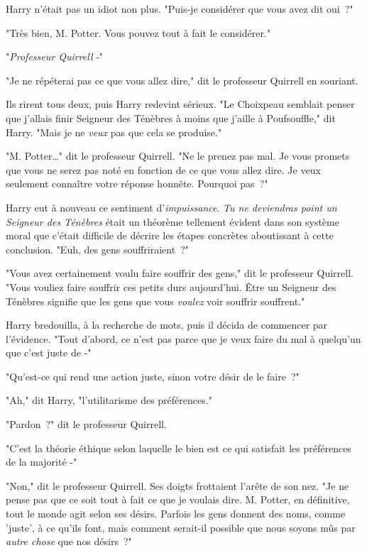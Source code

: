 Harry n'était pas un idiot non plus. "Puis-je considérer que vous avez dit oui~?"

"Très bien, M. Potter. Vous pouvez tout à fait le considérer."

"\emph{Professeur Quirrell} -"

"Je ne répéterai pas ce que vous allez dire," dit le professeur Quirrell en souriant.

Ils rirent tous deux, puis Harry redevint sérieux. "Le Choixpeau semblait penser que j'allais finir Seigneur des Ténèbres à moins que j'aille à Poufsouffle," dit Harry. "Mais je ne \emph{veux} pas que cela se produise."

"M. Potter…" dit le professeur Quirrell. "Ne le prenez pas mal. Je vous promets que vous ne serez pas noté en fonction de ce que vous allez dire. Je veux seulement connaître votre réponse honnête. Pourquoi pas~?"

Harry eut à nouveau ce sentiment d'\emph{impuissance}. \emph{Tu ne deviendras point un Seigneur des Ténèbres} était un théorème tellement évident dans son système moral que c'était difficile de décrire les étapes concrètes aboutissant à cette conclusion. "Euh, des gens souffriraient~?"

"Vous avez certainement voulu faire souffrir des gens," dit le professeur Quirrell. "Vous vouliez faire souffrir ces petits durs aujourd'hui. Être un Seigneur des Ténèbres signifie que les gens que vous \emph{voulez} voir souffrir souffrent."

Harry bredouilla, à la recherche de mots, puis il décida de commencer par l'évidence. "Tout d'abord, ce n'est pas parce que je veux faire du mal à quelqu'un que c'est juste de -"

"Qu'est-ce qui rend une action juste, sinon votre désir de le faire~?"

"Ah," dit Harry, "l'utilitarisme des préférences."

"Pardon~?" dit le professeur Quirrell.

"C'est la théorie éthique selon laquelle le bien est ce qui satisfait les préférences de la majorité -"

"Non," dit le professeur Quirrell. Ses doigts frottaient l'arête de son nez. "Je ne pense pas que ce soit tout à fait ce que je voulais dire. M. Potter, en définitive, tout le monde agit selon ses désirs. Parfois les gens donnent des noms, comme 'juste', à ce qu'ils font, mais comment serait-il possible que nous soyons mûs par \emph{autre chose} que nos désirs~?"


